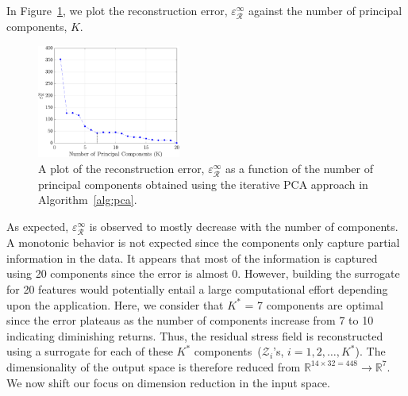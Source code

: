 In Figure~\ref{fig:pca}, we plot the reconstruction error, $\varepsilon_\mathcal{R}^\infty$ against the number of
principal components, $K$. 
%
\begin{figure}[htbp]
\begin{center}
\includegraphics[width=0.42\textwidth]{./Figures/error_PCA}
\end{center}
\caption{A plot of the reconstruction error, $\varepsilon_\mathcal{R}^\infty$ as a function of the
number of principal components obtained using the iterative PCA approach in Algorithm~\ref{alg:pca}.}
\label{fig:pca}
\end{figure}
%
As expected, $\varepsilon_\mathcal{R}^\infty$ is observed to mostly decrease with the number of components. 
A monotonic behavior is not expected since the components only capture partial information in the data. It 
appears that most of the information is captured using 20 components since the error is almost 0. However,
building the surrogate for 20 features would potentially entail a large computational effort depending upon the
application. Here, we consider that $K^\ast$ = 7 components are optimal since the error plateaus as the number of
components increase from 7 to 10 indicating diminishing returns. Thus, the residual stress field is reconstructed
using a surrogate for each of these $K^\ast$ components~($\mathcal{Z}_i$'s, $i = 1,2,\ldots,K^\ast$).
The dimensionality of the output space is therefore reduced 
from $\mathbb{R}^{14\times 32=448}\rightarrow \mathbb{R}^7$. We now shift our focus on dimension reduction
in the input space.

